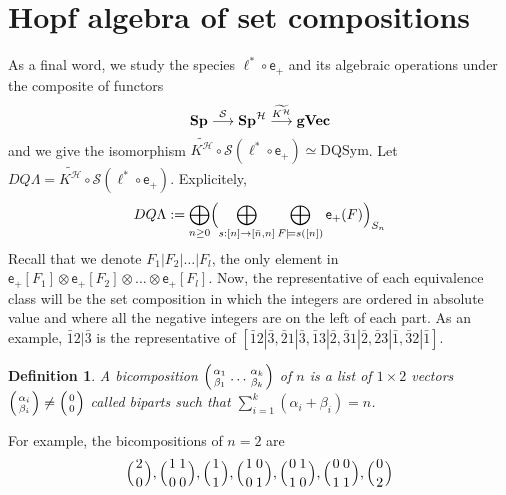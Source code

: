 \documentclass[11pt,reqno]{amsart}
\numberwithin{equation}{section}
\newtheorem{definition}[theorem]{Definition}
\newtheorem{rem}[theorem]{Remark}
\def\S{{\mathbb S}}
\def\Sp{{\mathbf{Sp}}}
\def\SpB{{\mathbf{Sp}^{\H}}}
\def\gVec{{\mathbf{gVec}}}
\def\H{{\mathcal{H}}}
\def\p{{\textsf{p}}}
\def\exp{{\textsf{e}}}
\def\DQL{DQ\Lambda}
\def\S{{\mathcal{S}}}
\def\Kb{\overline{K}}
\def\KBb{\overline{K^{\H}}}
\def\KBt{\widetilde{K^{\H}}}
\def\id{\mathrm{id}}
\def\DQSym{\mathrm{DQSym}}
\begin{document}


\section{Hopf algebra of set compositions}\label{Sec:QPi}

As a final word, we study the species $\ell^{\ast}\circ \exp_+$ and its algebraic operations under the composite of functors
$$\Sp \buildrel \S \over{\longrightarrow} \SpB \buildrel \KBt \over{\longrightarrow}\gVec$$
and we give the isomorphism $\KBt\circ \S(\ell^{\ast}\circ\exp_+)\simeq \DQSym$. Let $\DQL=\KBt\circ \S(\ell^{\ast}\circ\exp_+)$. Explicitely,
\begin{equation}
\DQL:=\bigoplus_{n\geq 0} \Bigl{(}\bigoplus_{s:[n]\rightarrow [\bar{n},n]} \bigoplus_{F\models s([n])}\exp_+(F)\Bigr{)}_{S_n}\\
\end{equation}
Recall that we denote $F_1|F_2|\dots |F_l$, the only element in $\exp_+[F_1]\otimes \exp_+[F_2]\otimes\dots\otimes\exp_+[F_l]$. Now, the representative of each equivalence class will be the set composition in which the integers are ordered in absolute value and where all the negative integers are on the left of each part. As an example, $\bar{1}2|\bar{3}$ is the representative of $[\bar{1}2|\bar{3},\bar{2}1|\bar{3},\bar{1}3|\bar{2},\bar{3}1|\bar{2},\bar{2}3|\bar{1},\bar{3}2|\bar{1}]$.

\begin{definition}
A bicomposition $\Bigl{(}{\alpha_1 \atop \beta_1}\dots {\alpha_k \atop \beta_k}\Bigr{)}$ of $n$ is a list of $1\times 2$ vectors $\Bigl{(}{\alpha_i \atop \beta_i}\Bigr{)}\neq \Bigl{(} {0\atop 0}\Bigr{)}$ called biparts such that $\sum_{i=1}^k(\alpha_i+\beta_i)=n$.
\end{definition}
For example, the bicompositions of $n=2$ are
$$\Bigl{(}{2 \atop 0}\Bigr{)}, \Bigl{(}{1 \atop 0}{1\atop 0}\Bigr{)}, \Bigl{(}{1 \atop 1}\Bigr{)}, \Bigl{(}{1 \atop 0}{0\atop 1}\Bigr{)}, \Bigl{(}{0 \atop 1}{1\atop 0}\Bigr{)}, \Bigl{(}{0 \atop 1}{0\atop 1}\Bigr{)}, \Bigl{(}{0 \atop 2}\Bigr{)}$$
\end{document}
